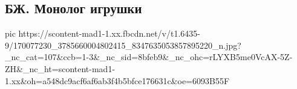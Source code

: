  
 
 
 
 

\subsection{БЖ. Монолог игрушки}


\ifcmt
  pic https://scontent-mad1-1.xx.fbcdn.net/v/t1.6435-9/170077230_3785660004802415_8347635053857895220_n.jpg?_nc_cat=107&ccb=1-3&_nc_sid=8bfeb9&_nc_ohc=rLYXB5me0VcAX-5Z-ZH&_nc_ht=scontent-mad1-1.xx&oh=a548dc9acf6af6ab3f4b5bfce176631c&oe=6093B55F
\fi


